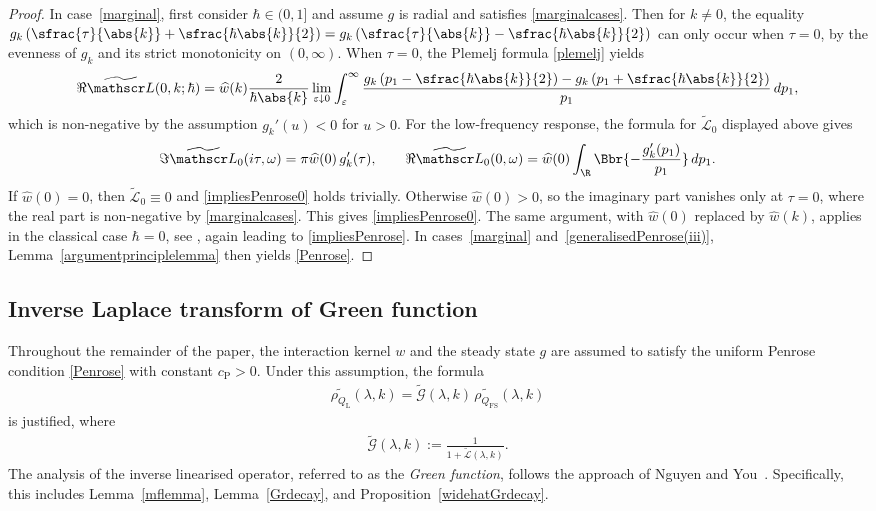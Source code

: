 \begin{proof}
In case~\eqref{marginal}, first consider $\hbar\in(0,1]$ and assume \( g \) is radial and satisfies \eqref{marginalcases}. Then for \( k \neq 0 \), the equality $g_k\left( \sfrac{\tau}{\abs{k}} + \sfrac{\hbar \abs{k}}{2} \right)
=
g_k\left( \sfrac{\tau}{\abs{k}} - \sfrac{\hbar \abs{k}}{2} \right)$
can only occur when \( \tau = 0 \), by the evenness of \( g_k \) and its strict monotonicity on $(0,\infty)$. When \( \tau = 0 \), the Plemelj formula \eqref{plemelj} yields
\[
\Re \widetilde{\mathscr L}(0,k;\hbar)
= \widehat w(k)\frac{2}{\hbar \abs{k}}
\lim_{\varepsilon \downarrow 0} \int_\varepsilon^\infty
\frac{
g_k\left(p_1 - \sfrac{\hbar \abs{k}}{2}\right)
- g_k\left(p_1 + \sfrac{\hbar \abs{k}}{2}\right)
}{p_1} \, dp_1,
\]
which is non-negative by the assumption \( g_k'(u) < 0 \) for \( u > 0 \). For the low-frequency response, the formula for \( \widetilde{\mathscr L}_0 \) displayed above gives
\[
\Im \widetilde{\mathscr L}_0(i\tau,\omega) = \pi\widehat w(0)\,g_k'(\tau),
\qquad
\Re \widetilde{\mathscr L}_0(0,\omega) = \widehat w(0)\int_{\R}\Bbr{-\frac{g_k'(p_1)}{p_1}}\,dp_1.
\]
If \( \widehat w(0)=0 \), then \( \widetilde{\mathscr L}_0\equiv0 \) and \eqref{impliesPenrose0} holds trivially. Otherwise \( \widehat w(0)>0 \), so the imaginary part vanishes only at \( \tau = 0 \), where the real part is non-negative by \eqref{marginalcases}. This gives \eqref{impliesPenrose0}. The same argument, with \( \widehat w(0) \) replaced by \( \widehat w(k) \), applies in the classical case \( \hbar = 0 \), see \eg \cite{bed-mas-mou-2016}, again leading to \eqref{impliesPenrose}. In cases~\eqref{marginal} and~\eqref{generalisedPenrose(iii)}, Lemma~\ref{argumentprinciplelemma} then yields \eqref{Penrose}.
\end{proof}

\subsection{Inverse Laplace transform of Green function}
Throughout the remainder of the paper, the interaction kernel \( w \) and the steady state \( g \) are assumed to satisfy the uniform Penrose condition \eqref{Penrose} with constant \( {c_{\mathrm{P}}} > 0 \). Under this assumption, the formula
\begin{align}
\widetilde{\rho_{Q_{\mathrm{L}}}}(\lambda,k) = \widetilde{\mathscr{G}}(\lambda,k)\,\widetilde{\rho_{Q_{\mathrm{FS}}}}(\lambda,k) \label{1/1+L}
\end{align}
is justified, where
\begin{align}
\widetilde{\mathscr{G}}(\lambda,k) := \frac{1}{1 + \widetilde{\mathscr{L}}(\lambda,k)}. \label{definitionofwidetildeG}
\end{align}
The analysis of the inverse linearised operator, referred to as the \textit{Green function}, follows the approach of Nguyen and You~\cite{NguyenYou2023}. Specifically, this includes Lemma~\ref{mflemma}, Lemma~\ref{Grdecay}, and Proposition~\ref{widehatGrdecay}.

